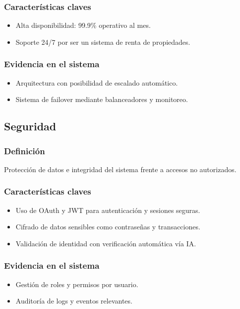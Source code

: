 		\subsubsection*{Características claves}
			\begin{itemize}
				\item Alta disponibilidad: 99.9\% operativo al mes.
				\item Soporte 24/7 por ser un sistema de renta de propiedades.
			\end{itemize}
		
		\subsubsection*{Evidencia en el sistema}
			\begin{itemize}
				\item Arquitectura con posibilidad de escalado automático.
				\item Sistema de failover mediante balanceadores y monitoreo.
			\end{itemize}
	
	\newpage
	\subsection{Seguridad}
		\subsubsection*{Definición}
			\noindent Protección de datos e integridad del sistema frente a accesos no autorizados.
		
		\subsubsection*{Características claves}
			\begin{itemize}
				\item Uso de OAuth y JWT para autenticación y sesiones seguras.
				\item Cifrado de datos sensibles como contraseñas y transacciones.
				\item Validación de identidad con verificación automática vía IA.
			\end{itemize}
	
		\subsubsection*{Evidencia en el sistema}
			\begin{itemize}
				\item Gestión de roles y permisos por usuario.
				\item Auditoría de logs y eventos relevantes.
			\end{itemize}
	
